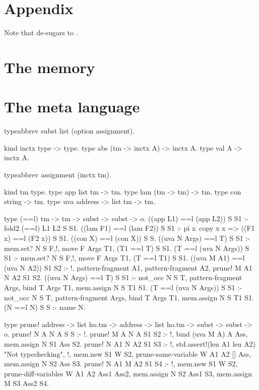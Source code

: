 \section*{Appendix}

Note that  de-sugars to .

\section{The memory}



\section{The meta language}
\begin{elpicode}
  typeabbrev subst list (option assignment).

  kind inctx type -> type.
  type abs (tm -> inctx A) -> inctx A.
  type val A -> inctx A.

  typeabbrev assignment (inctx tm).

  kind tm  type.
  type app list tm -> tm.
  type lam (tm -> tm) -> tm.
  type con string -> tm.
  type uva  address -> list tm -> tm.

  type (==l) tm -> tm -> subst -> subst ->  o.
  ((app L1) ==l (app L2)) S S1 :- fold2 (==l) L1 L2 S S1.
  ((lam F1) ==l (lam F2)) S S1 :- 
    pi x\ copy x x => ((F1 x) ==l (F2 x)) S S1.
  ((con X) ==l (con X)) S S.
  ((uva N Args) ==l T) S S1 :- 
    mem.set? N S F,!, move F Args T1, (T1 ==l T) S S1.
  (T ==l (uva N Args)) S S1 :- 
    mem.set? N S F,!, move F Args T1, (T ==l T1) S S1.
  ((uva M A1) ==l (uva N A2)) S1 S2 :- !, 
    pattern-fragment A1, pattern-fragment A2, 
    prune! M A1 N A2 S1 S2.
  ((uva N Args) ==l T) S S1 :- not_occ N S T, pattern-fragment Args, 
    bind T Args T1, mem.assign N S T1 S1.
  (T ==l (uva N Args)) S S1 :- not_occ N S T, pattern-fragment Args, 
    bind T Args T1, mem.assign N S T1 S1.
  (N ==l N) S S :- name N.

  type prune! address -> list ho.tm -> address -> 
              list ho.tm -> subst -> subst -> o.
  prune! N A  N A  S S :- !.
  prune! M A  N A  S1 S2 :- !, bind (uva M A) A Ass, 
    mem.assign N S1 Ass S2.
  prune! N A1 N A2 S1 S3 :- !,
    std.assert!(len A1 {len A2}) "Not typechecking", !,
    mem.new S1 W S2, prune-same-variable W A1 A2 [] Ass,
    mem.assign N S2 Ass S3.
  prune! N A1 M A2 S1 S4 :- !,
    mem.new S1 W S2, prune-diff-variables W A1 A2 Ass1 Ass2, 
    mem.assign N S2 Ass1 S3,
    mem.assign M S3 Ass2 S4. 


\end{elpicode}
